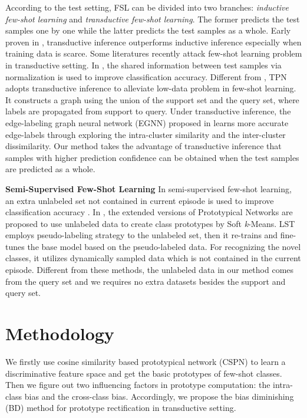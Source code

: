 \documentclass[runningheads]{llncs}
\begin{document}
According to the test setting, FSL can be divided into two branches: \textit{inductive few-shot learning} and \textit{transductive few-shot learning}. The former predicts the test samples one by one while the latter predicts the test samples as a whole. Early proven in \cite{joachims1999transductive,zhou2003learning}, transductive inference outperforms inductive inference especially when training data is scarce. Some literatures recently attack few-shot learning problem in transductive setting.
In \cite{nichol2018on}, the shared information between test samples via normalization is used to improve classification accuracy. Different from \cite{nichol2018on}, TPN \cite{liu2019learning} adopts transductive inference to alleviate low-data problem in few-shot learning. It constructs a graph using the union of the support set and the query set, where labels are propagated from support to query. Under transductive inference, the edge-labeling graph neural network (EGNN) proposed in \cite{kim2019edge} learns more accurate edge-labels through exploring the intra-cluster similarity and the inter-cluster dissimilarity.
Our method takes the advantage of transductive inference that samples with higher prediction confidence can be obtained when the test samples are predicted as a whole. 




\textbf{Semi-Supervised Few-Shot Learning}
In semi-supervised few-shot learning, an extra unlabeled set not contained in current episode is used to improve classification accuracy \cite{satorras2018few,ren2018meta,li2019learning}. In \cite{ren2018meta}, the extended versions of Prototypical Networks \cite{snell2017prototypical} are proposed to use unlabeled data to create class prototypes by Soft \textit{k}-Means. LST \cite{li2019learning} employs pseudo-labeling strategy to the unlabeled set, then it re-trains and fine-tunes the base model based on the pseudo-labeled data. For recognizing the novel classes, it utilizes dynamically sampled data which is not contained in the current episode. 
Different from these methods, the unlabeled data in our method comes from the query set and we requires no extra datasets besides the support and query set.




\section{Methodology} 
We firstly use cosine similarity based prototypical network (CSPN) to learn a discriminative feature space and get the basic prototypes of few-shot classes.
Then we figure out two influencing factors in prototype computation: the intra-class bias and the cross-class bias. Accordingly, we propose the bias diminishing (BD) method for prototype rectification in transductive setting.
\end{document}
